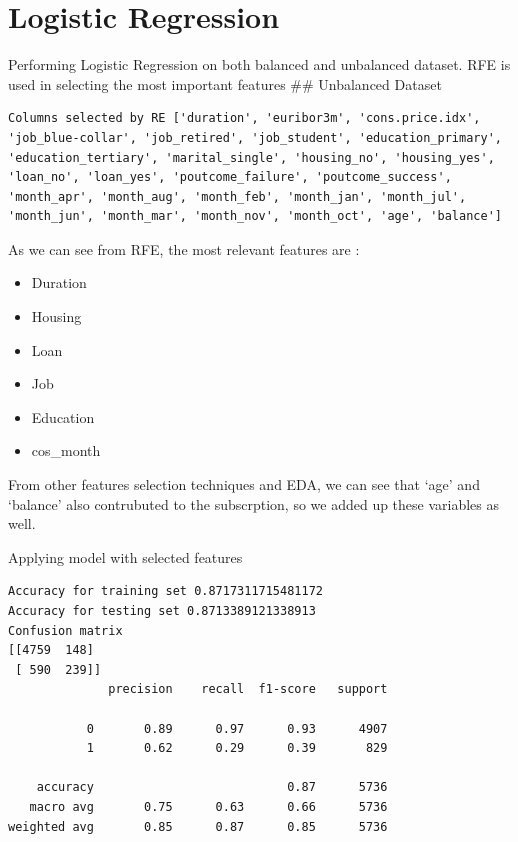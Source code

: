 \documentclass[
  letterpaper,
  DIV=11,
  numbers=noendperiod]{scrartcl}
\providecommand{\tightlist}{%
  \setlength{\itemsep}{0pt}\setlength{\parskip}{0pt}}\usepackage{longtable,booktabs,array}
\begin{document}
\hypertarget{logistic-regression}{%
\section{Logistic Regression}\label{logistic-regression}}

Performing Logistic Regression on both balanced and unbalanced dataset.
RFE is used in selecting the most important features \#\# Unbalanced
Dataset

\begin{verbatim}
Columns selected by RE ['duration', 'euribor3m', 'cons.price.idx', 'job_blue-collar', 'job_retired', 'job_student', 'education_primary', 'education_tertiary', 'marital_single', 'housing_no', 'housing_yes', 'loan_no', 'loan_yes', 'poutcome_failure', 'poutcome_success', 'month_apr', 'month_aug', 'month_feb', 'month_jan', 'month_jul', 'month_jun', 'month_mar', 'month_nov', 'month_oct', 'age', 'balance']
\end{verbatim}

As we can see from RFE, the most relevant features are :

\begin{itemize}
\tightlist
\item
  Duration
\item
  Housing
\item
  Loan
\item
  Job
\item
  Education
\item
  cos\_month
\end{itemize}

From other features selection techniques and EDA, we can see that `age'
and `balance' also contrubuted to the subscrption, so we added up these
variables as well.

Applying model with selected features

\begin{verbatim}
Accuracy for training set 0.8717311715481172
Accuracy for testing set 0.8713389121338913
Confusion matrix 
[[4759  148]
 [ 590  239]]
              precision    recall  f1-score   support

           0       0.89      0.97      0.93      4907
           1       0.62      0.29      0.39       829

    accuracy                           0.87      5736
   macro avg       0.75      0.63      0.66      5736
weighted avg       0.85      0.87      0.85      5736
\end{verbatim}
\end{document}
